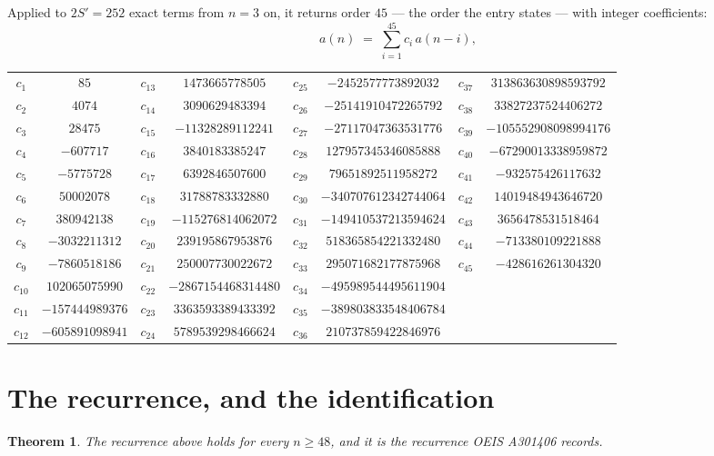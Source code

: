 \documentclass[11pt,a4paper]{article}
\theoremstyle{plain}
\newtheorem{theorem}{Theorem}
\theoremstyle{definition}
\begin{document}
Applied to $2S'=252$ exact terms from $n=3$ on, it returns order $45$ --- the
order the entry states --- with integer coefficients:
\[
a(n)\;=\;\sum_{i=1}^{45}c_i\,a(n-i),
\]
\begin{center}\small
\begin{tabular}{cccccccc}
$c_{1}$ & $85$ & $c_{13}$ & $1473665778505$ & $c_{25}$ & $-2452577773892032$ & $c_{37}$ & $313863630898593792$ \\
$c_{2}$ & $4074$ & $c_{14}$ & $3090629483394$ & $c_{26}$ & $-25141910472265792$ & $c_{38}$ & $33827237524406272$ \\
$c_{3}$ & $28475$ & $c_{15}$ & $-11328289112241$ & $c_{27}$ & $-27117047363531776$ & $c_{39}$ & $-105552908098994176$ \\
$c_{4}$ & $-607717$ & $c_{16}$ & $3840183385247$ & $c_{28}$ & $127957345346085888$ & $c_{40}$ & $-67290013338959872$ \\
$c_{5}$ & $-5775728$ & $c_{17}$ & $6392846507600$ & $c_{29}$ & $79651892511958272$ & $c_{41}$ & $-932575426117632$ \\
$c_{6}$ & $50002078$ & $c_{18}$ & $31788783332880$ & $c_{30}$ & $-340707612342744064$ & $c_{42}$ & $14019484943646720$ \\
$c_{7}$ & $380942138$ & $c_{19}$ & $-115276814062072$ & $c_{31}$ & $-149410537213594624$ & $c_{43}$ & $3656478531518464$ \\
$c_{8}$ & $-3032211312$ & $c_{20}$ & $239195867953876$ & $c_{32}$ & $518365854221332480$ & $c_{44}$ & $-713380109221888$ \\
$c_{9}$ & $-7860518186$ & $c_{21}$ & $250007730022672$ & $c_{33}$ & $295071682177875968$ & $c_{45}$ & $-428616261304320$ \\
$c_{10}$ & $102065075990$ & $c_{22}$ & $-2867154468314480$ & $c_{34}$ & $-495989544495611904$ &  &  \\
$c_{11}$ & $-157444989376$ & $c_{23}$ & $3363593389433392$ & $c_{35}$ & $-389803833548406784$ &  &  \\
$c_{12}$ & $-605891098941$ & $c_{24}$ & $5789539298466624$ & $c_{36}$ & $210737859422846976$ &  &  \\
\end{tabular}
\end{center}

\section{The recurrence, and the identification}

\begin{theorem}
The recurrence above holds for every $n\ge48$, and it is the recurrence OEIS A301406 records.
\end{theorem}
\end{document}

